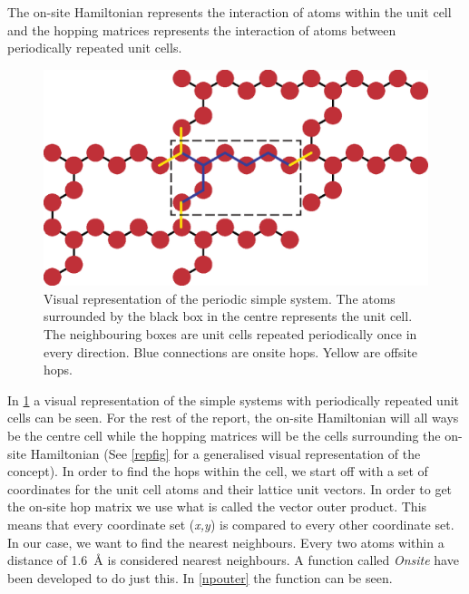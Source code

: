 The on-site Hamiltonian represents the interaction of atoms within the unit cell and the hopping matrices represents the interaction of atoms between periodically repeated unit cells.
\begin{figure}[ht]
	\centering
	\includegraphics[width=.7\textwidth]{Figures/atomreffig.eps}
	\caption{Visual representation of the periodic simple system. The atoms surrounded by the black box in the centre represents the unit cell. The neighbouring boxes are unit cells repeated periodically once in every direction. Blue connections are onsite hops. Yellow are offsite hops.}
	\label{atomrepfig}
\end{figure}
In \cref{atomrepfig} a visual representation of the simple systems with periodically repeated unit cells can be seen. For the rest of the report, the on-site Hamiltonian will all ways be the centre cell while the hopping matrices will be the cells surrounding the on-site Hamiltonian (See \cref{repfig} for a generalised visual representation of the concept).\newline
In order to find the hops within the cell, we start off with a set of coordinates for the unit cell atoms and their lattice unit vectors. In order to get the on-site hop matrix we use what is called the vector outer product. This means that every coordinate set (\textit{x,y}) is compared to every other coordinate set. In our case, we want to find the nearest neighbours. Every two atoms within a distance of \SI{1.6}{\angstrom} is considered nearest neighbours. A function called \textit{Onsite} have been developed to do just this. In \cref{npouter} the function can be seen.
\vspace{-1\baselineskip}
\vspace{\baselineskip}
